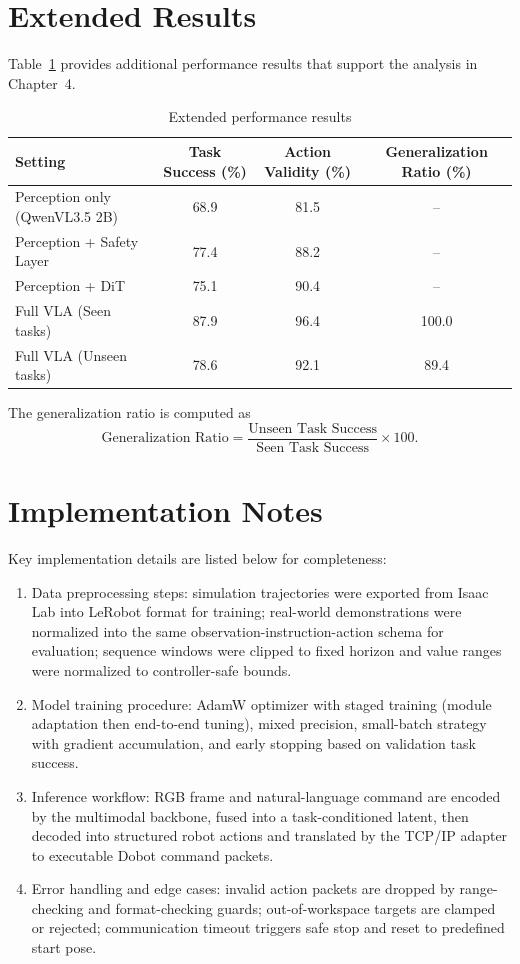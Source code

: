 \section{Extended Results}
Table~\ref{tab:appendix-extended-results} provides additional performance results that support the analysis in Chapter~4.

\begin{table}[ht]
    \centering
    \caption{Extended performance results}
    \label{tab:appendix-extended-results}
    \begin{tabular}{lccc}
        \hline
        Setting & Task Success (\%) & Action Validity (\%) & Generalization Ratio (\%) \\
        \hline
        Perception only (QwenVL3.5 2B) & 68.9 & 81.5 & -- \\
        Perception + Safety Layer & 77.4 & 88.2 & -- \\
        Perception + DiT & 75.1 & 90.4 & -- \\
        Full VLA (Seen tasks) & 87.9 & 96.4 & 100.0 \\
        Full VLA (Unseen tasks) & 78.6 & 92.1 & 89.4 \\
        \hline
    \end{tabular}
\end{table}

The generalization ratio is computed as
\[
\text{Generalization Ratio} = \frac{\text{Unseen Task Success}}{\text{Seen Task Success}} \times 100.
\]

\section{Implementation Notes}
Key implementation details are listed below for completeness:

\begin{enumerate}
    \item Data preprocessing steps: simulation trajectories were exported from Isaac Lab into LeRobot format for training; real-world demonstrations were normalized into the same observation-instruction-action schema for evaluation; sequence windows were clipped to fixed horizon and value ranges were normalized to controller-safe bounds.
    \item Model training procedure: AdamW optimizer with staged training (module adaptation then end-to-end tuning), mixed precision, small-batch strategy with gradient accumulation, and early stopping based on validation task success.
    \item Inference workflow: RGB frame and natural-language command are encoded by the multimodal backbone, fused into a task-conditioned latent, then decoded into structured robot actions and translated by the TCP/IP adapter to executable Dobot command packets.
    \item Error handling and edge cases: invalid action packets are dropped by range-checking and format-checking guards; out-of-workspace targets are clamped or rejected; communication timeout triggers safe stop and reset to predefined start pose.
\end{enumerate}

